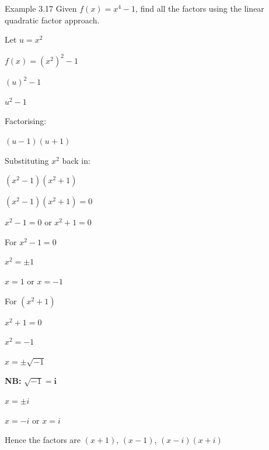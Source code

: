 \begin{example}{Example 3.17}
Given $f(x) = x^4 - 1$, find all the factors using the linear quadratic factor approach.

\solution
Let $u = x^2$

$f(x) = (x^2)^2 - 1$

$(u)^2 - 1$

$u^2 - 1$

Factorising:

$(u - 1)(u + 1)$

Substituting $x^2$ back in:

$(x^2 - 1)(x^2 + 1)$

$(x^2 - 1)(x^2 + 1) = 0$

$x^2 - 1 = 0$ or $x^2 + 1 = 0$

For $x^2 - 1 = 0$

$x^2 = \pm 1$

$x = 1$ or $x = -1$

For $(x^2 + 1)$

$x^2 + 1 = 0$

$x^2 = -1$

$x = \pm\sqrt{-1}$

\textbf{NB:} $\sqrt{-1} = \boldsymbol{i}$

$x = \pm i$

$x = -i$ or $x = i$

Hence the factors are $(x + 1)$, $(x - 1)$, $(x - i)(x + i)$
\end{example}

